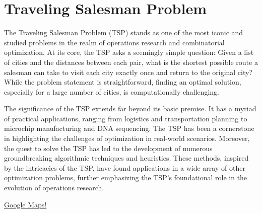 %
%
%
%


\section{Traveling Salesman Problem}
\label{sec:tsp-models}
The Traveling Salesman Problem (TSP) stands as one of the most iconic and studied problems in the realm of operations research and combinatorial optimization. At its core, the TSP asks a seemingly simple question: Given a list of cities and the distances between each pair, what is the shortest possible route a salesman can take to visit each city exactly once and return to the original city? While the problem statement is straightforward, finding an optimal solution, especially for a large number of cities, is computationally challenging.

The significance of the TSP extends far beyond its basic premise. It has a myriad of practical applications, ranging from logistics and transportation planning to microchip manufacturing and DNA sequencing. The TSP has been a cornerstone in highlighting the challenges of optimization in real-world scenarios. Moreover, the quest to solve the TSP has led to the development of numerous groundbreaking algorithmic techniques and heuristics. These methods, inspired by the intricacies of the TSP, have found applications in a wide array of other optimization problems, further emphasizing the TSP's foundational role in the evolution of operations research.



\href{https://www.google.com/maps/dir/(38.2222341,+-85.75750389999999)/(39.0972041,+-84.52636389999999)/(38.0493956,+-84.4940986)/(37.1967465,+-80.4296817)/(37.2049884,+-79.9237747)/(37.5110489,+-77.40769019999999)/(35.2019605,+-80.81365720000001)/(36.1303318,+-86.78998039999999)/(38.2222341,+-85.75750389999999)/@36.8110947,-84.2113181,7.02z/data=!4m37!4m36!1m3!2m2!1d-85.7575039!2d38.2222341!1m3!2m2!1d-84.5263639!2d39.0972041!1m3!2m2!1d-84.4940986!2d38.0493956!1m3!2m2!1d-80.4296817!2d37.1967465!1m3!2m2!1d-79.9237747!2d37.2049884!1m3!2m2!1d-77.4076902!2d37.5110489!1m3!2m2!1d-80.8136572!2d35.2019605!1m3!2m2!1d-86.7899804!2d36.1303318!1m3!2m2!1d-85.7575039!2d38.2222341}{Google Maps!}

